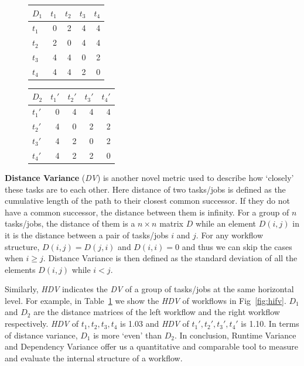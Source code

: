 \begin{figure}
\centering

\begin{tabular}{l|rrrr}
\hline
$D_1$ & $t_1$ & $t_2$ & $t_3$ &$t_4$\\
\hline
$t_1$ & 0 & 2 & 4 & 4 \\
$t_2$ & 2 & 0 & 4 & 4 \\
$t_3$ & 4 & 4 & 0 & 2\\
$t_4$ & 4 & 4 & 2 & 0 \\
\end{tabular}
\begin{tabular}{l|rrrr}
\hline
$D_2$ & $t_1'$ & $t_2'$ & $t_3'$ &$t_4'$\\
\hline
$t_1'$ & 0 & 4 & 4 & 4 \\
$t_2'$ & 4 & 0 & 2 & 2 \\
$t_3'$ & 4 & 2 & 0 & 2\\
$t_4'$ & 4 & 2 & 2 & 0 \\
\end{tabular}
  \label{tab:1}
\end{figure}


\textbf{Distance Variance} ({\em DV}) is another novel metric used to describe how `closely' these tasks are to each other. Here distance of two tasks/jobs is defined as the cumulative length of the path to their closest common successor. If they do not have a common successor, the distance between them is infinity. For a group of $n$ tasks/jobs, the distance of them is a $n\times n$ matrix $D$ while an element $D(i,j)$ in it is the distance between a pair of tasks/jobs $i$ and $j$. For any workflow structure, $D(i,j)=D(j,i)$ and $D(i,i)=0$ and thus we can skip the cases when $i \geq j$. Distance Variance is then defined as the standard deviation of all the elements $D(i,j)$ while $i<j$. 

Similarly, {\em HDV} indicates the {\em DV} of a group of tasks/jobs at the same horizontal level. For example, in Table~\ref{tab:1} we show the {\em HDV} of workflows in Fig~\ref{fig:hifv}. $D_1$ and $D_2$ are the distance matrices of the left workflow and the right workflow respectively. {\em HDV} of $t_1, t_2, t_3, t_4$ is 1.03 and {\em HDV} of $t_1', t_2', t_3', t_4'$ is 1.10. In terms of distance variance, $D_1$ is more `even' than $D_2$.  
In conclusion, Runtime Variance and Dependency Variance offer us a quantitative and comparable tool to measure and evaluate the internal structure of a workflow. 


